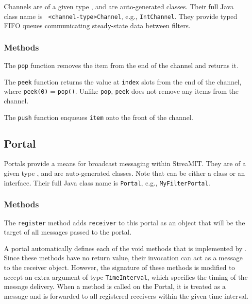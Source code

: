 Channels are of a given type {\tt <channel-type>}, and are
auto-generated classes.  Their full Java class name is {\tt
<channel-type>Channel}, e.g., {\tt IntChannel}.  They provide typed
FIFO queues communicating steady-state data between filters.

\subsubsection{Methods}

  The {\tt pop} function removes the item from the end of the channel and returns it.

  The {\tt peek} function returns the value at {\tt index} slots from the end of the channel, where {\tt peek(0)} = {\tt pop()}.  Unlike {\tt pop}, {\tt peek} does not remove any items from the channel.

  The {\tt push} function enqueues {\tt item} onto the front of the channel.

\subsection{Portal}

Portals provide a means for broadcast messaging within StreaMIT.  They
are of a given type {\tt <portal-type>}, and are auto-generated
classes.  Note that {\tt <portal-type>} can be either a class or an
interface.  Their full Java class name is {\tt <portal-type>Portal},
e.g., {\tt MyFilterPortal}.

\subsubsection{Methods}

  The {\tt register} method adds {\tt receiver} to this portal as an object that will be the target of all messages passed to the portal.

  A portal automatically defines each of the void methods that is implemented by {\tt <portal-type>}.  Since these methods have no return value, their invocation can act as a message to the receiver object.  However, the signature of these methods is modified to accept an extra argument of type {\tt TimeInterval}, which specifies the timing of the message delivery.  When a method is called on the Portal, it is treated as a message and is forwarded to all registered receivers within the given time interval.

